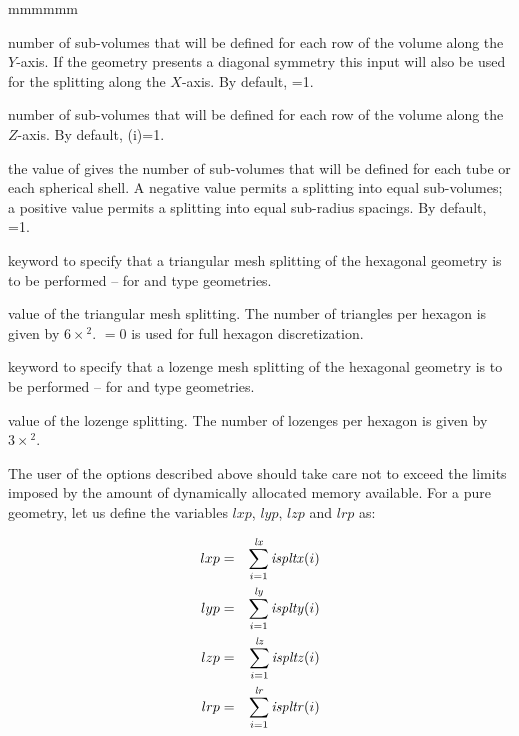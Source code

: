 \begin{ListeDeDescription}{mmmmmm}
\item[\dusa{isplty}] number of sub-volumes that will be defined for each row of the volume along the $Y$-axis. If the geometry presents a diagonal symmetry this input will also be used for the splitting along the $X$-axis. By default, =1.

\item[\dusa{ispltz}] number of sub-volumes that will be defined for each row of the volume along the $Z$-axis. By default, (i)=1.

\item[\dusa{ispltr}] the value of  gives the number of sub-volumes that will be defined for each tube or each spherical shell. A negative value permits a splitting into equal sub-volumes; a positive value permits a splitting into equal sub-radius spacings. By default, =1.

\item[\moc{SPLITH}] keyword to specify that a triangular mesh splitting of the hexagonal geometry is to be performed -- for  and  type geometries. 

\item[\dusa{isplth}] value of the triangular mesh splitting. The number of triangles per hexagon is given by $6 \times$$^2$.  $=0$ is used for full hexagon discretization.

\item[\moc{SPLITL}] keyword to specify that a lozenge mesh splitting of the hexagonal geometry is to be performed -- for  and  type geometries.

\item[\dusa{ispltl}] value of the lozenge splitting. The number of lozenges per hexagon is given by $3 \times$$^2$.

\end{ListeDeDescription}

The user of the options described above should take care not to exceed  the
limits imposed by the amount of dynamically allocated memory available. For a
pure geometry, let us define the variables $lxp$, $lyp$, $lzp$ and $lrp$ as:

\begin{eqnarray*}
lxp&=&\sum_{i=1}^{{\it lx}} {\it ispltx}(i) \\
lyp&=&\sum_{i=1}^{{\it ly}} {\it isplty}(i) \\
lzp&=&\sum_{i=1}^{{\it lz}} {\it ispltz}(i) \\
lrp&=&\sum_{i=1}^{{\it lr}} {\it ispltr}(i) \\
\end{eqnarray*}

